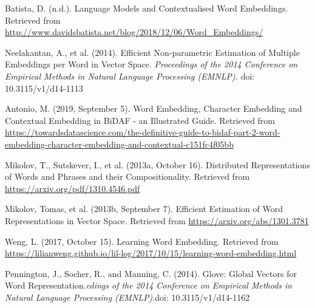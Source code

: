 \begin{frame}{}

\begin{enumerateSpaced}{5pt}
    \scriptsize
    \setcounter{enumi}{7}
    

    \item Batista, D. (n.d.). Language Models and Contextualised Word Embeddings. Retrieved from \url{http://www.davidsbatista.net/blog/2018/12/06/Word_Embeddings/}
    
    \item Neelakantan, A., et al. (2014). Efficient Non-parametric Estimation of Multiple Embeddings per Word in Vector Space. \emph{Proceedings of the 2014 Conference on Empirical Methods in Natural Language Processing (EMNLP).} doi: 10.3115/v1/d14-1113
    
    \item Antonio, M. (2019, September 5). Word Embedding, Character Embedding and Contextual Embedding in BiDAF - an Illustrated Guide. Retrieved from \url{https://towardsdatascience.com/the-definitive-guide-to-bidaf-part-2-word-embedding-character-embedding-and-contextual-c151fc4f05bb}
    
    \item Mikolov, T., Sutskever, I., et al. (2013a, October 16). Distributed Representations of Words and Phrases and their Compositionality. Retrieved from \url{https://arxiv.org/pdf/1310.4546.pdf}
    
    \item Mikolov, Tomas, et al. (2013b, September 7). Efficient Estimation of Word Representations in Vector Space. Retrieved from \url{https://arxiv.org/abs/1301.3781}
    
    \item Weng, L. (2017, October 15). Learning Word Embedding. Retrieved from \url{https://lilianweng.github.io/lil-log/2017/10/15/learning-word-embedding.html}


    \item Pennington, J., Socher, R., and Manning, C. (2014). Glove: Global Vectors for Word Representation.\emph{edings of the 2014 Conference on Empirical Methods in Natural Language Processing (EMNLP)}.doi: 10.3115/v1/d14-1162
    
\end{enumerateSpaced}
    
\end{frame}




